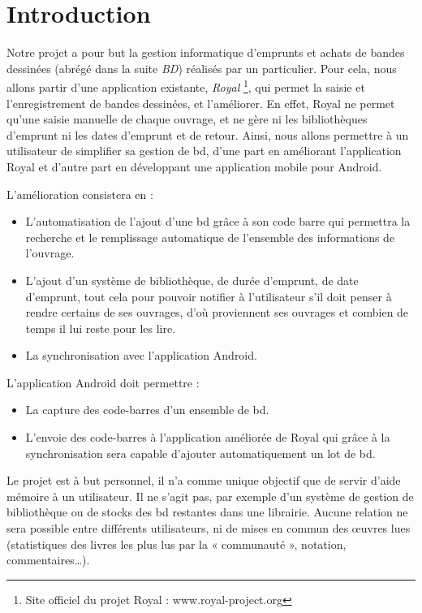 \part*{Introduction}
Notre projet a pour but la gestion informatique d'emprunts et achats de bandes dessinées (abrégé dans la suite \emph{BD}) réalisés par un particulier.
Pour cela, nous allons partir d'une application existante, \emph{Royal}
\footnote{Site officiel du projet Royal : www.royal-project.org}, qui permet la saisie et l'enregistrement de bandes dessinées, et l'améliorer.
En effet, Royal ne permet qu'une saisie manuelle de chaque ouvrage, et ne gère ni les bibliothèques d'emprunt ni les dates d'emprunt et de retour. Ainsi, nous allons permettre à un utilisateur de simplifier sa gestion de bd, d'une part en améliorant l'application Royal et d'autre part en développant une application mobile pour Android.

L'amélioration consistera en :
\begin{itemize}
\item L'automatisation de l'ajout d'une bd grâce à son code barre qui permettra la recherche et le remplissage automatique de l'ensemble des informations de l'ouvrage.
\item L'ajout d'un système de bibliothèque, de durée d'emprunt, de date d'emprunt, tout cela pour pouvoir notifier à l'utilisateur s'il doit penser à rendre certains de ses ouvrages, d'où proviennent ses ouvrages et combien de temps il lui reste pour les lire.
\item La synchronisation avec l'application Android.
\end{itemize}

L'application Android doit permettre :
\begin{itemize}
\item La capture des code-barres d'un ensemble de bd.
\item L'envoie des code-barres à l'application améliorée de Royal qui grâce à la synchronisation sera capable d'ajouter automatiquement un lot de bd.
\end{itemize}

Le projet est à but personnel, il n'a comme unique objectif que de servir d'aide mémoire à un utilisateur.
Il ne s'agit pas, par exemple d'un système de gestion de bibliothèque ou de stocks des bd restantes dans une librairie.
Aucune relation ne sera possible entre différents utilisateurs, ni de mises en commun des œuvres lues
(statistiques des livres les plus lus par la « communauté », notation, commentaires…).

